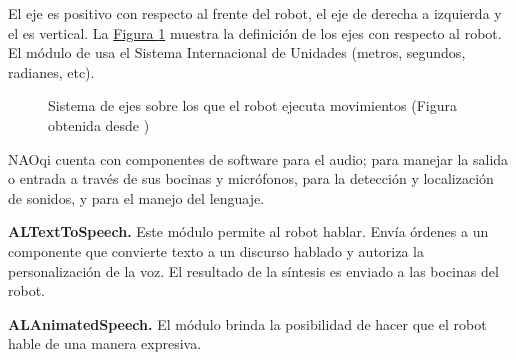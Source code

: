 
El eje  es positivo con respecto al frente del robot, el eje  de
derecha a izquierda y el  es vertical.
La \hyperref[\detokenize{chapter_one/naoqi:almotionaxis}]{Figura \ref{\detokenize{chapter_one/naoqi:almotionaxis}}} muestra la definición de los ejes con respecto al robot.
El módulo de  usa el Sistema Internacional de Unidades (metros,
segundos, radianes, etc).
\begin{figure}[!ht]
\centering
\capstart

\noindent{}
\caption{Sistema de ejes sobre los que el robot ejecuta movimientos (Figura obtenida desde \cite{naotorsoaxis})}\label{\detokenize{chapter_one/naoqi:almotionaxis}}\end{figure}




NAOqi cuenta con componentes de software para el audio; para
manejar la salida o entrada a través de sus bocinas y micrófonos,
para la detección y localización de sonidos,  y para el manejo del lenguaje.


\textbf{ALTextToSpeech.}
\label{\detokenize{chapter_one/naoqi:altexttospeech}}
Este módulo permite al robot hablar. Envía órdenes a un componente que
convierte texto a un discurso hablado y autoriza la personalización de la voz.
El resultado de la síntesis es enviado a las bocinas del robot.


\textbf{ALAnimatedSpeech.}
\label{\detokenize{chapter_one/naoqi:alanimatedspeech}}
El módulo  brinda la posibilidad de hacer que el robot hable
de una manera expresiva.

